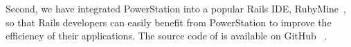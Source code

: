 Second, we have integrated PowerStation into %
a popular Rails IDE, RubyMine~\cite{RubyMine}, 
so that Rails developers can easily benefit from PowerStation to improve the efficiency of their applications.
%
The source code of \Tool is available on GitHub ~\cite{analysisFM}. 
